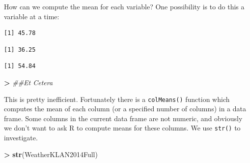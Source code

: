 \documentclass[
]{krantz}
\makeatletter
\newenvironment{Shaded}{\begin{snugshade}}{\end{snugshade}}
\newcommand{\CommentTok}[1]{\textcolor[rgb]{0.37,0.37,0.37}{\textit{#1}}}
\newcommand{\KeywordTok}[1]{\textcolor[rgb]{0.27,0.27,0.27}{\textbf{#1}}}
\newcommand{\NormalTok}[1]{#1}
\newcommand{\OperatorTok}[1]{\textcolor[rgb]{0.43,0.43,0.43}{\textbf{#1}}}
\newcommand{\StringTok}[1]{\textcolor[rgb]{0.5,0.5,0.5}{#1}}
\newenvironment{kframe}{%
\medskip{}
\setlength{\fboxsep}{.8em}
 \def\at@end@of@kframe{}%
 \ifinner\ifhmode%
  \def\at@end@of@kframe{\end{minipage}}%
  \begin{minipage}{\columnwidth}%
 \fi\fi%
 \def\FrameCommand##1{\hskip\@totalleftmargin \hskip-\fboxsep
 \colorbox{shadecolor}{##1}\hskip-\fboxsep
     \hskip-\linewidth \hskip-\@totalleftmargin \hskip\columnwidth}%
 \MakeFramed {\advance\hsize-\width
   \@totalleftmargin\z@ \linewidth\hsize
   \@setminipage}}%
 {\par\unskip\endMakeFramed%
 \at@end@of@kframe}
\renewenvironment{Shaded}{\begin{kframe}}{\end{kframe}}
\makeatother
\begin{document}
How can we compute the mean for each variable? One possibility is to do this a variable at a time:

\begin{Shaded}
\end{Shaded}

\begin{verbatim}
[1] 45.78
\end{verbatim}

\begin{Shaded}
\end{Shaded}

\begin{verbatim}
[1] 36.25
\end{verbatim}

\begin{Shaded}
\end{Shaded}

\begin{verbatim}
[1] 54.84
\end{verbatim}

\begin{Shaded}
\begin{Highlighting}[]
\OperatorTok{\textgreater{}}\StringTok{ }\CommentTok{\#\#Et Cetera}
\end{Highlighting}
\end{Shaded}

This is pretty inefficient. Fortunately there is a \texttt{colMeans()} function which computes the mean of each column (or a specified number of columns) in a data frame. Some columns in the current data frame are not numeric, and obviously we don't want to ask R to compute means for these columns. We use \texttt{str()} to investigate.

\begin{Shaded}
\begin{Highlighting}[]
\OperatorTok{\textgreater{}}\StringTok{ }\KeywordTok{str}\NormalTok{(WeatherKLAN2014Full)}
\end{Highlighting}
\end{Shaded}
\end{document}
